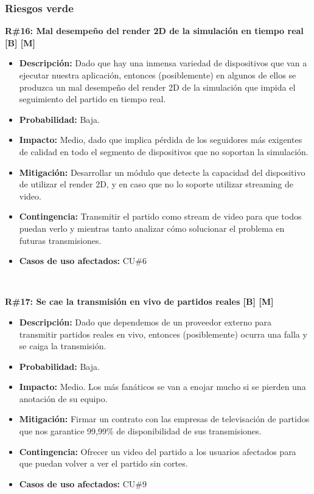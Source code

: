 \subsubsection{Riesgos verde}

\noindent\textbf{R\#16: Mal desempeño del render 2D de la simulación en tiempo real [B] [M] } 
\begin{itemize}
	\item{\textbf{Descripción:} Dado que hay una inmensa variedad de dispositivos que van a ejecutar nuestra aplicación, entonces (posiblemente) en algunos de ellos se produzca un mal desempeño del render 2D de la simulación que impida el seguimiento del partido en tiempo real.}
	\item{\textbf{Probabilidad:} Baja.}
	\item{\textbf{Impacto:} Medio, dado que implica pérdida de los seguidores más exigentes de calidad en todo el segmento de dispositivos que no soportan la simulación.}
	\item{\textbf{Mitigación:} Desarrollar un módulo que detecte la capacidad del dispositivo de utilizar el render 2D, y en caso que no lo soporte utilizar streaming de video.}
	\item{\textbf{Contingencia:} Transmitir el partido como stream de video para que todos puedan verlo y mientras tanto analizar cómo solucionar el problema en futuras transmisiones.}
	\item{\textbf{Casos de uso afectados:} CU\#6}
\end{itemize}

~

\noindent\textbf{R\#17: Se cae la transmisión en vivo de partidos reales [B] [M]} 
\begin{itemize}
	\item{\textbf{Descripción:} Dado que dependemos de un proveedor externo para transmitir partidos reales en vivo, entonces (posiblemente) ocurra una falla y se caiga la transmisión.}
	\item{\textbf{Probabilidad:} Baja.}
	\item{\textbf{Impacto:} Medio. Los más fanáticos se van a enojar mucho si se pierden una anotación de su equipo.}
	\item{\textbf{Mitigación:} Firmar un contrato con las empresas de televisación de partidos que nos garantice 99,99\% de disponibilidad de sus transmisiones.}
	\item{\textbf{Contingencia:} Ofrecer un video del partido a los usuarios afectados para que puedan volver a ver el partido sin cortes.}
	\item{\textbf{Casos de uso afectados:} CU\#9}
\end{itemize}

